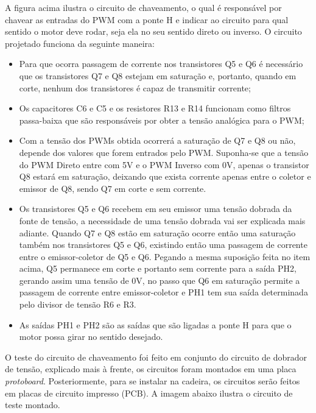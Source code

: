 A figura acima ilustra o circuito de chaveamento, o qual é responsável por chavear as entradas do PWM com a ponte H e indicar ao circuito para qual sentido o motor deve rodar, seja ela no seu sentido direto ou inverso. O circuito projetado funciona da seguinte maneira:

\begin{itemize}
	\item Para que ocorra passagem de corrente nos transistores Q5 e Q6 é
        necessário que os transistores Q7 e Q8 estejam em saturação e,
        portanto, quando em corte, nenhum dos transistores é capaz de
        transmitir corrente;
	\item Os capacitores C6 e C5 e os resistores R13 e R14 funcionam como
        filtros passa-baixa que são responsáveis por obter a tensão analógica
        para o PWM;
    \item Com a tensão dos PWMs obtida ocorrerá a saturação de Q7 e Q8 ou não,
        depende dos valores que forem entrados pelo PWM. Suponha-se que a
        tensão do PWM Direto entre com 5V e o PWM Inverso com 0V, apenas o
        transistor Q8 estará em saturação, deixando que exista corrente apenas
        entre o coletor e emissor de Q8, sendo Q7 em corte e sem corrente. 
    \item Os transistores Q5 e Q6 recebem em seu emissor uma tensão dobrada da
        fonte de tensão, a necessidade de uma tensão dobrada vai ser explicada
        mais adiante. Quando Q7 e Q8 estão em saturação ocorre então uma
        saturação também nos transistores Q5 e Q6, existindo então uma passagem
        de corrente entre o emissor-coletor de Q5 e Q6. Pegando a mesma
        suposição feita no item acima, Q5 permanece em corte e portanto sem
        corrente para a saída PH2, gerando assim uma tensão de 0V, no passo que
        Q6 em saturação permite a passagem de corrente entre emissor-coletor e
        PH1 tem sua saída determinada pelo divisor de tensão R6 e R3.
    \item As saídas PH1 e PH2 são as saídas que são ligadas a ponte H para que
        o motor possa girar no sentido desejado.
\end{itemize}

O teste do circuito de chaveamento foi feito em conjunto do circuito de
dobrador de tensão, explicado mais à frente, os circuitos foram montados em uma
placa \textit{protoboard}. Posteriormente, para se instalar na cadeira, os
circuitos serão feitos em placas de circuito impresso (PCB). A imagem abaixo
ilustra o circuito de teste montado.

